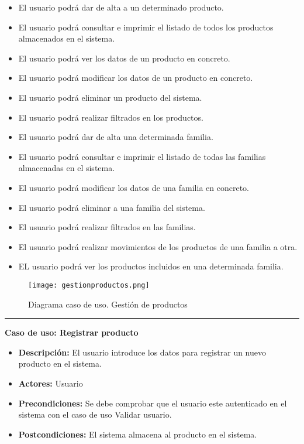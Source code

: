 \begin{itemize}
 \item El usuario podrá dar de alta a un determinado producto. 
 \item El usuario podrá consultar e imprimir el listado de todos los productos almacenados en el sistema.
 \item El usuario podrá ver los datos de un producto en concreto.
 \item El usuario podrá modificar los datos de un producto en concreto.
 \item El usuario podrá eliminar un producto del sistema.
 \item El usuario podrá realizar filtrados en los productos.
 \item El usuario podrá dar de alta una determinada familia.
 \item El usuario podrá consultar e imprimir el listado de todas las familias almacenadas en el sistema.
 \item El usuario podrá modificar los datos de una familia en concreto.
 \item El usuario podrá eliminar a una familia del sistema.
 \item El usuario podrá realizar filtrados en las familias.
 \item El usuario podrá realizar movimientos de los productos de una familia a otra.
\item EL usuario podrá ver los productos incluidos en una determinada familia.

\end{itemize}
\begin{figure}[H]
  \centering
    \texttt{[image: gestionproductos.png]}
  \caption{Diagrama caso de uso. Gestión de productos}
  \label{cu2}
\end{figure}
\smallskip
\hrule height 1pt
\smallskip
\textbf{Caso de uso: Registrar producto}
\begin{itemize}\renewcommand{\labelitemi}{$\cdot$}
 \item \textbf{Descripción:} El usuario introduce los datos para registrar un nuevo producto en el sistema.
  \item \textbf{Actores:} Usuario
  \item \textbf{Precondiciones:} Se debe comprobar que el usuario este autenticado en el sistema con el caso de uso Validar usuario.
  \item \textbf{Postcondiciones:} El sistema almacena al producto en el sistema.
\end{itemize}
